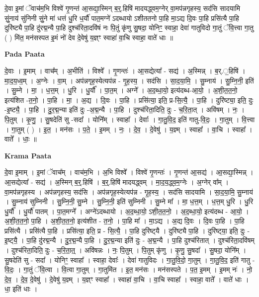 \documentclass[17pt]{extarticle}
\begin{document}
दे॒वा इ॒मां ॅवाच॑म॒भि विश्वे॑ गृ॒णन्त॑ आ॒सद्या॒स्मिन् ब॒र्॒.हिषि॑ मादयद्ध्वम॒ग्नेर् वा॒मप॑न्नगृहस्य॒ सद॑सि सादयामि सुं॒नाय॑ सुंनिनी सुं॒ने मा॑ धत्तं धु॒रि ध॒र्यौ॑ पात॒मग्ने॑ ऽदब्धायो ऽशीततनो पा॒हि मा॒ऽद्य दि॒वः पा॒हि प्रसि॑त्यै पा॒हि दुरि॑ष्ट्यै पा॒हि दु॑रद्म॒न्यै पा॒हि दुश्च॑रिता॒दवि॑षं नः पि॒तुं कृ॑णु सु॒षदा॒ योनिꣳ॒॒ स्वाहा॒ देवा॑ गातुविदो गा॒तुं ॅवि॒त्त्वा गा॒तु ( ) मि॑त॒ मन॑सस्पत इ॒मं नो॑ देव दे॒वेषु॑ य॒ज्ञ्ꣳ स्वाहा॑ वा॒चि स्वाहा॒ वाते॑ धाः ॥ \newline

\textbf{Pada Paata} \newline

दे॒वाः । इ॒माम् । वाच᳚म् । अ॒भीति॑ । विश्वे᳚ । गृ॒णन्तः॑ । आ॒सद्येत्या᳚ - सद्य॑ । अ॒स्मिन्न् । ब॒र्.॒हिषि॑ । मा॒द॒य॒ध्व॒म् । अ॒ग्नेः । वा॒म् । अप॑न्नगृह॒स्येत्यप॑न्न - गृ॒ह॒स्य॒ । सद॑सि । सा॒द॒या॒मि॒ । सु॒म्नाय॑ । सु॒म्नि॒नी॒ इति॑ । सु॒म्ने । मा॒ । ध॒त्त॒म् । धु॒रि । धु॒र्यौ᳚ । पा॒त॒म् । अग्ने᳚ । अ॒द॒ब्धा॒यो॒ इत्य॑दब्ध-आ॒यो॒ । अ॒शी॒त॒त॒नो॒ इत्य॑शित -त॒नो॒ । पा॒हि । मा॒ । अ॒द्य । दि॒वः । पा॒हि । प्रसि॑त्या॒ इति॒ प्र-सि॒त्यै॒ । पा॒हि । दुरि॑ष्ट्या॒ इति॒ दुः -इ॒ष्ट्यै॒ । पा॒हि । दु॒र॒द्म॒न्या इति॑ दुः -अ॒द्म॒न्यै । पा॒हि । दुश्च॑रिता॒दिति॒ दुः - च॒रि॒ता॒त् । अवि॑षम् । नः॒ । पि॒तुम् । कृ॒णु॒ । सु॒षदेति॑ सु -सदा᳚ । योनि᳚म् । स्वाहा᳚ । देवाः᳚ । गा॒तु॒वि॒द॒ इति॑ गातु-वि॒दः॒ । गा॒तुम् । वि॒त्त्वा । गा॒तुम् ( ) । इ॒त॒ । मन॑सः । प॒ते॒ । इ॒मम् । नः॒ । दे॒व॒ । दे॒वेषु॑ । य॒ज्ञ्म् । स्वाहा᳚ । वा॒चि । स्वाहा᳚ । वाते᳚ । धाः॒ ॥  \newline


\textbf{Krama Paata} \newline

दे॒वा इ॒माम् । इ॒मां ॅवाच᳚म् । वाच॑म॒भि । अ॒भि विश्वे᳚ । विश्वे॑ गृ॒णन्तः॑ । गृ॒णन्त॑ आ॒सद्य॑ । आ॒सद्या॒स्मिन्न् । आ॒सद्येत्या᳚ - सद्य॑ । अ॒स्मिन् ब॒र्॒.हिषि॑ । ब॒र्॒.हिषि॑ मादयद्ध्वम् । मा॒द॒य॒द्ध्व॒म॒ग्नेः । अ॒ग्नेर् वा᳚म् । वा॒मप॑न्नगृहस्य । अप॑न्नगृहस्य॒ सद॑सि । अप॑न्नगृह॒स्येत्यप॑न्न - गृ॒ह॒स्य॒ । सद॑सि सादयामि । सा॒द॒या॒मि॒ सु॒म्नाय॑ । सु॒म्नाय॑ सुम्निनी । सु॒म्नि॒नी॒ सु॒म्ने । सु॒म्नि॒नी॒ इति॑ सुम्निनी । सु॒म्ने मा᳚ । मा॒ ध॒त्त॒म् । ध॒त्त॒म् धु॒रि । धु॒रि धु॒र्यौ᳚ । धु॒र्यौ॑ पातम् । पा॒त॒मग्ने᳚ । अग्ने॑ऽदब्धायो । अ॒द॒ब्धा॒यो॒ ऽशी॒त॒त॒नो॒ । अ॒द॒ब्धा॒यो॒ इत्य॑दब्ध - आ॒यो॒ । अ॒शी॒त॒त॒नो॒ पा॒हि । अ॒शी॒त॒त॒नो॒ इत्य॑शीत - त॒नो॒ । पा॒हि मा᳚ । मा॒ऽद्य । अ॒द्य दि॒वः । दि॒वः पा॒हि । पा॒हि प्रसि॑त्यै । प्रसि॑त्यै पा॒हि । प्रसि॑त्या॒ इति॒ प्र - सि॒त्यै॒ । पा॒हि दुरि॑ष्ट्‍यै । दुरि॑ष्ट्यै पा॒हि । दुरि॑ष्ट्‍या॒ इति॒ दुः - इ॒ष्ट्‍यै॒ । पा॒हि दु॑रद्म॒न्यै । दु॒र॒द्म॒न्यै पा॒हि । दु॒र॒द्म॒न्या इति॑ दुः - अ॒द्म॒न्यै । पा॒हि दुश्च॑रितात् । दुश्च॑रिता॒दवि॑षम् । दुश्च॑रिता॒दिति॒ दुः - च॒रि॒ता॒त्॒ । अवि॑षन्नः । नः॒ पि॒तुम् । पि॒तुम् कृ॑णु । कृ॒णु॒ सु॒षदा᳚ । सु॒षदा॒ योनि᳚म् । सु॒षदेति॑ सु - सदा᳚ । योनिꣳ॒॒ स्वाहा᳚ । स्वाहा॒ देवाः᳚ । देवा॑ गातुविदः । गा॒तु॒वि॒दो॒ गा॒तुम् । गा॒तु॒वि॒द॒ इति॑ गातु - वि॒दः॒ । गा॒तुं ॅवि॒त्वा । वि॒त्वा गा॒तुम् । गा॒तुमि॑त । इ॒त॒ मन॑सः । मन॑सस्पते । प॒त॒ इ॒मम् । इ॒मम् नः॑ । नो॒ दे॒व॒ । दे॒व॒ दे॒वेषु॑ । दे॒वेषु॑ य॒ज्ञ्म् । य॒ज्ञ्ꣳ स्वाहा᳚ । स्वाहा॑ वा॒चि । वा॒चि स्वाहा᳚ । स्वाहा॒ वाते᳚ । वाते॑ धाः । धा॒ इति॑ धाः । \newline
\end{document}
